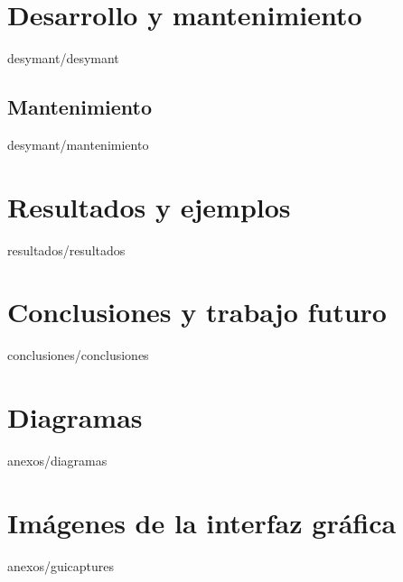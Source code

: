\documentclass[epsbased,copyright,final,printable,covers,extendedindex,firstnumbered,tfg,gnuplot]{tfgtfmthesisuam}
\begin{document}
\chapter{Desarrollo y mantenimiento\label{CAP:DESYMANT}}{desymant/desymant}
	\section{Mantenimiento\label{SEC:MANTENIMIENTO}}{desymant/mantenimiento}
\chapter{Resultados y ejemplos\label{CAP:RESULTADOS}}{resultados/resultados}
\chapter{Conclusiones y trabajo futuro\label{CAP:CONCLUSIONES}}{conclusiones/conclusiones}


\appendix

\chapter{Diagramas\label{CAP:DIAGRAMAS}}{anexos/diagramas}
\chapter{Imágenes de la interfaz gráfica\label{CAP:GUICAPTURES}}{anexos/guicaptures}
\end{document}
